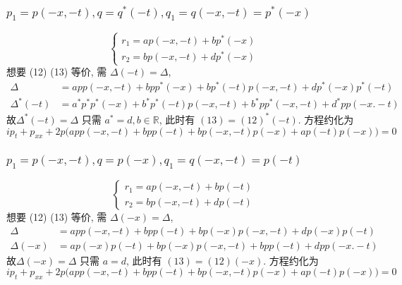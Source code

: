 \subsubsection{ $ p_{1} = p(-x,-t), q = q^{*}(-t), q_{1} = q(-x,-t) = p^{*}(-x) $}
\begin{equation*}
    \begin{cases}
        r_1 = ap(-x,-t) + bp^{*}(-x) \\
        r_2 = bp(-x,-t) + dp^{*}(-x)
    \end{cases}
\end{equation*}
想要 (12) (13) 等价, 需 $ \Delta(-t) = \Delta $,
\begin{equation*}
    \begin{aligned}
        \Delta &= app(-x,-t) + bpp^{*}(-x) + bp^{*}(-t)p(-x,-t) + dp^{*}(-x)p^{*}(-t) \\
        \Delta^{*}(-t) &= a^{*}p^{*}p^{*}(-x) + b^{*}p^{*}(-t)p(-x,-t) + b^{*}pp^{*}(-x,-t) + d^{*}pp(-x.-t)   
    \end{aligned}
\end{equation*}
故$ \Delta^{*}(-t) = \Delta $ 只需 $ a^{*} = d , b \in \mathbb{R}$, 此时有 $ (13) = (12)^{*}(-t) $. 方程约化为
\begin{equation*}
    ip_t + p_{xx} + 2p \big( app(-x,-t) + bpp(-t) + bp(-x,-t)p(-x) + ap(-t)p(-x) \big) = 0
\end{equation*}

\subsubsection{ $ p_{1} = p(-x,-t), q = p(-x), q_{1} = q(-x,-t) = p(-t) $}
\begin{equation*}
    \begin{cases}
        r_1 = ap(-x,-t) + bp(-t) \\
        r_2 = bp(-x,-t) + dp(-t)
    \end{cases}
\end{equation*}
想要 (12) (13) 等价, 需 $ \Delta(-x) = \Delta $,
\begin{equation*}
    \begin{aligned}
        \Delta &= app(-x,-t) + bpp(-t) + bp(-x)p(-x,-t) + dp(-x)p(-t) \\
        \Delta(-x) &= ap(-x)p(-t) + bp(-x)p(-x,-t) + bpp(-t) + dpp(-x.-t)   
    \end{aligned}
\end{equation*}
故$ \Delta(-x) = \Delta $ 只需 $ a = d $, 此时有 $ (13) = (12)(-x) $. 方程约化为
\begin{equation*}
    ip_t + p_{xx} + 2p \big( app(-x,-t) + bpp(-t) + bp(-x,-t)p(-x) + ap(-t)p(-x) \big) = 0
\end{equation*}

